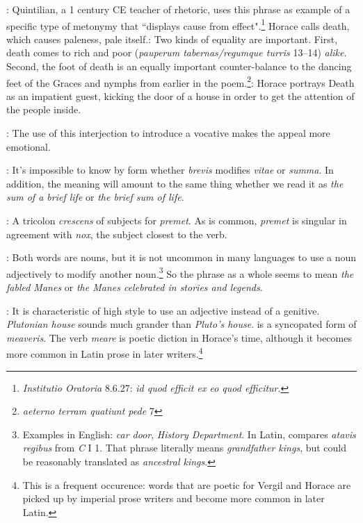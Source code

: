 
: Quintilian, a 1 century CE teacher of rhetoric, uses this phrase as example of a specific type of metonymy that ``displays cause from effect".\footnote{\textit{Institutio Oratoria} 8.6.27: \textit{id quod efficit ex eo quod efficitur}.}  Horace calls death, which causes paleness, pale itself.\indent{}: Two kinds of equality are important. First, death comes to rich and poor (\textit{pauperum tabernas/regumque turris} 13--14) \textit{alike}.  Second, the foot of death is an equally important counter-balance to the dancing feet of the Graces and nymphs from earlier in the poem.\footnote{\textit{aeterno terram quatiunt pede} 7}\indent{}: Horace portrays Death as an impatient guest, kicking the door of a house in order to get the attention of the people inside.


: The use of this interjection to introduce a vocative makes the appeal more emotional.


: It's impossible to know by form whether \textit{brevis} modifies \textit{vitae} or \textit{summa}.  In addition, the meaning will amount to the same thing whether we read it as \textit{the sum of a brief life} or \textit{the brief sum of life}.


: A tricolon \textit{crescens} of subjects for \textit{premet}.  As is common, \textit{premet} is singular in agreement with \textit{nox}, the subject closest to the verb.


: Both words are nouns, but it is not uncommon in many languages to use a noun adjectively to modify another noun.\footnote{Examples in English: \textit{car door}, \textit{History Department}. In Latin, \citet[84]{mayer2012} compares \textit{atavis \lips regibus} from \textit{C} I 1.  That phrase literally means \textit{grandfather kings}, but could be reasonably translated as \textit{ancestral kings}.}  So the phrase as a whole seems to mean \textit{the fabled Manes} or \textit{the Manes celebrated in stories and legends}.


: It is characteristic of high style to use an adjective instead of a genitive.  \textit{Plutonian house} sounds much grander than \textit{Pluto's house}.\indent{} is a syncopated form of \textit{meaveris}.  The verb \textit{meare} is poetic diction in Horace's time, although it becomes more common in Latin prose in later writers.\footnote{This is a frequent occurence: words that are poetic for Vergil and Horace are picked up by imperial prose writers and become more common in later Latin.}

